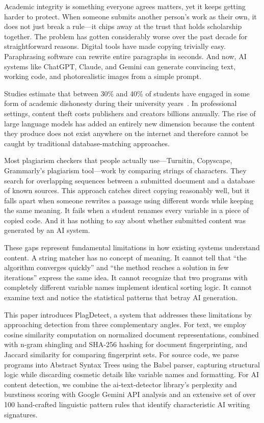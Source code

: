 \documentclass[10pt,twocolumn]{article}
\begin{document}
Academic integrity is something everyone agrees matters, yet it keeps getting harder to protect. When someone submits another person's work as their own, it does not just break a rule---it chips away at the trust that holds scholarship together. The problem has gotten considerably worse over the past decade for straightforward reasons. Digital tools have made copying trivially easy. Paraphrasing software can rewrite entire paragraphs in seconds. And now, AI systems like ChatGPT, Claude, and Gemini can generate convincing text, working code, and photorealistic images from a simple prompt.

Studies estimate that between 30\% and 40\% of students have engaged in some form of academic dishonesty during their university years~\cite{schleimer2003}. In professional settings, content theft costs publishers and creators billions annually. The rise of large language models has added an entirely new dimension because the content they produce does not exist anywhere on the internet and therefore cannot be caught by traditional database-matching approaches.

Most plagiarism checkers that people actually use---Turnitin, Copyscape, Grammarly's plagiarism tool---work by comparing strings of characters. They search for overlapping sequences between a submitted document and a database of known sources. This approach catches direct copying reasonably well, but it falls apart when someone rewrites a passage using different words while keeping the same meaning. It fails when a student renames every variable in a piece of copied code. And it has nothing to say about whether submitted content was generated by an AI system.

These gaps represent fundamental limitations in how existing systems understand content. A string matcher has no concept of meaning. It cannot tell that ``the algorithm converges quickly'' and ``the method reaches a solution in few iterations'' express the same idea. It cannot recognize that two programs with completely different variable names implement identical sorting logic. It cannot examine text and notice the statistical patterns that betray AI generation.

This paper introduces PlagDetect, a system that addresses these limitations by approaching detection from three complementary angles. For text, we employ cosine similarity computation on normalized document representations, combined with n-gram shingling and SHA-256 hashing for document fingerprinting, and Jaccard similarity for comparing fingerprint sets. For source code, we parse programs into Abstract Syntax Trees using the Babel parser, capturing structural logic while discarding cosmetic details like variable names and formatting. For AI content detection, we combine the ai-text-detector library's perplexity and burstiness scoring with Google Gemini API analysis and an extensive set of over 100 hand-crafted linguistic pattern rules that identify characteristic AI writing signatures.
\end{document}
